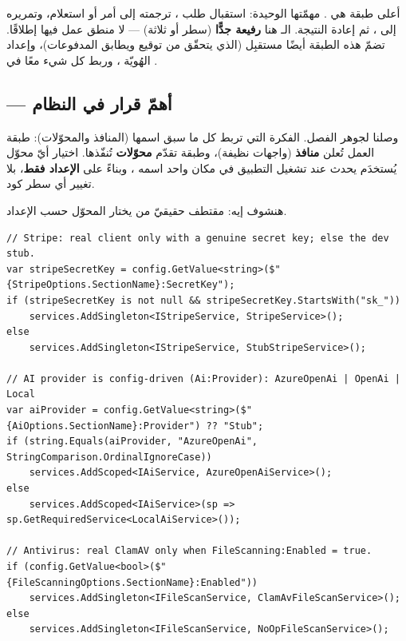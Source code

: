 أعلى طبقة هي . مهمّتها الوحيدة: استقبال طلب ، ترجمته إلى أمر أو
استعلام، وتمريره إلى ، ثم إعادة النتيجة. الـ  هنا
\textbf{رفيعة جدًّا} (سطر أو ثلاثة) — لا منطق عمل فيها إطلاقًا. تضمّ هذه الطبقة
أيضًا مستقبِل  (الذي يتحقّق من توقيع  ويطابق
المدفوعات)، وإعداد الهُويّة ، وربط كل شيء معًا في
.

\subsection{ — أهمّ قرار في النظام}

وصلنا لجوهر الفصل. الفكرة التي تربط كل ما سبق اسمها 
(المنافذ والمحوّلات): طبقة العمل تُعلن \textbf{منافذ} (واجهات نظيفة)، وطبقة
 تقدّم \textbf{محوّلات} تُنفّذها. اختيار أيّ محوّل يُستخدَم يحدث
عند تشغيل التطبيق في مكان واحد اسمه ، وبناءً على
\textbf{الإعداد فقط}، بلا تغيير أي سطر كود.

هنشوف إيه: مقتطف حقيقيّ من  يختار المحوّل حسب الإعداد.

\begin{english}
\begin{lstlisting}[language={[Sharp]C}]
// Stripe: real client only with a genuine secret key; else the dev stub.
var stripeSecretKey = config.GetValue<string>($"{StripeOptions.SectionName}:SecretKey");
if (stripeSecretKey is not null && stripeSecretKey.StartsWith("sk_"))
    services.AddSingleton<IStripeService, StripeService>();
else
    services.AddSingleton<IStripeService, StubStripeService>();

// AI provider is config-driven (Ai:Provider): AzureOpenAi | OpenAi | Local
var aiProvider = config.GetValue<string>($"{AiOptions.SectionName}:Provider") ?? "Stub";
if (string.Equals(aiProvider, "AzureOpenAi", StringComparison.OrdinalIgnoreCase))
    services.AddScoped<IAiService, AzureOpenAiService>();
else
    services.AddScoped<IAiService>(sp => sp.GetRequiredService<LocalAiService>());

// Antivirus: real ClamAV only when FileScanning:Enabled = true.
if (config.GetValue<bool>($"{FileScanningOptions.SectionName}:Enabled"))
    services.AddSingleton<IFileScanService, ClamAvFileScanService>();
else
    services.AddSingleton<IFileScanService, NoOpFileScanService>();
\end{lstlisting}
\end{english}

